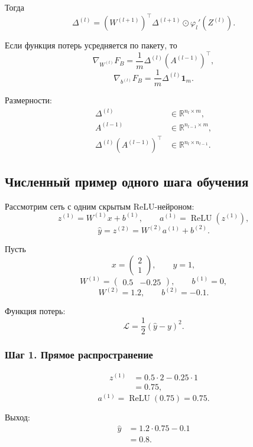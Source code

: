 \documentclass[12pt,a4paper]{article}
\theoremstyle{plain}
\theoremstyle{definition}
\theoremstyle{remark}
\newcommand{\R}{\mathbb{R}}
\begin{document}
Тогда
\[
    \Delta^{(l)}
    =
    \left(
        W^{(l+1)}
    \right)^\top
    \Delta^{(l+1)}
    \odot
    \varphi_l'(Z^{(l)}).
\]

Если функция потерь усредняется по пакету, то
\[
    \nabla_{W^{(l)}}F_B
    =
    \frac{1}{m}
    \Delta^{(l)}
    \left(
        A^{(l-1)}
    \right)^\top,
\]
\[
    \nabla_{b^{(l)}}F_B
    =
    \frac{1}{m}
    \Delta^{(l)}\mathbf{1}_m.
\]

Размерности:
\[
\begin{aligned}
    \Delta^{(l)}
    &\in\R^{n_l\times m},\\
    A^{(l-1)}
    &\in\R^{n_{l-1}\times m},\\
    \Delta^{(l)}(A^{(l-1)})^\top
    &\in\R^{n_l\times n_{l-1}}.
\end{aligned}
\]

\subsection{Численный пример одного шага обучения}

Рассмотрим сеть с одним скрытым ReLU-нейроном:
\[
    z^{(1)}=W^{(1)}x+b^{(1)},
    \qquad
    a^{(1)}=\operatorname{ReLU}(z^{(1)}),
\]
\[
    \widehat{y}
    =
    z^{(2)}
    =
    W^{(2)}a^{(1)}+b^{(2)}.
\]

Пусть
\[
    x=
    \begin{pmatrix}
        2\\
        1
    \end{pmatrix},
    \qquad
    y=1,
\]
\[
    W^{(1)}
    =
    \begin{pmatrix}
        0.5&-0.25
    \end{pmatrix},
    \qquad
    b^{(1)}=0,
\]
\[
    W^{(2)}=1.2,
    \qquad
    b^{(2)}=-0.1.
\]

Функция потерь:
\[
    \mathcal{L}
    =
    \frac{1}{2}(\widehat{y}-y)^2.
\]

\subsubsection*{Шаг 1. Прямое распространение}

\[
\begin{aligned}
    z^{(1)}
    &=
    0.5\cdot 2-0.25\cdot 1\\
    &=0.75,
\end{aligned}
\]
\[
    a^{(1)}
    =
    \operatorname{ReLU}(0.75)
    =
    0.75.
\]

Выход:
\[
\begin{aligned}
    \widehat{y}
    &=
    1.2\cdot 0.75-0.1\\
    &=0.8.
\end{aligned}
\]
\end{document}
